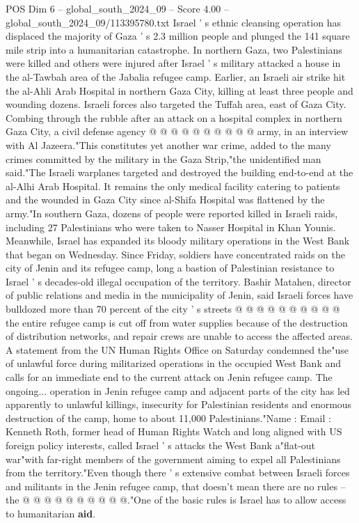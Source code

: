 \begin{textsample}{POS Dim 6 – global\_south\_2024\_09 – Score 4.00 – global\_south\_2024\_09/113395780.txt}
Israel ' s ethnic cleansing operation has displaced the majority of Gaza ' s 2.3 million people and plunged the 141 square mile strip into a humanitarian catastrophe.
In northern Gaza, two Palestinians were killed and others were injured after Israel ' s military attacked a house in the al-Tawbah area of the Jabalia refugee camp.
Earlier, an Israeli air strike hit the al-Ahli Arab Hospital in northern Gaza City, killing at least three people and wounding dozens.
Israeli forces also targeted the Tuffah area, east of Gaza City.
Combing through the rubble after an attack on a hospital complex in northern Gaza City, a civil defense agency @ @ @ @ @ @ @ @ @ @ army, in an interview with Al Jazeera."This constitutes yet another war crime, added to the many crimes committed by the military in the Gaza Strip,"the unidentified man said."The Israeli warplanes targeted and destroyed the building end-to-end at the al-Alhi Arab Hospital.
It remains the only medical facility catering to patients and the wounded in Gaza City since al-Shifa Hospital was flattened by the army."In southern Gaza, dozens of people were reported killed in Israeli raids, including 27 Palestinians who were taken to Nasser Hospital in Khan Younis.
Meanwhile, Israel has expanded its bloody military operations in the West Bank that began on Wednesday.
Since Friday, soldiers have concentrated raids on the city of Jenin and its refugee camp, long a bastion of Palestinian resistance to Israel ' s decades-old illegal occupation of the territory.
Bashir Matahen, director of public relations and media in the municipality of Jenin, said Israeli forces have bulldozed more than 70 percent of the city ' s streets @ @ @ @ @ @ @ @ @ @ the entire refugee camp is cut off from water supplies because of the destruction of distribution networks, and repair crews are unable to access the affected areas.
A statement from the UN Human Rights Office on Saturday condemned the"use of unlawful force during militarized operations in the occupied West Bank and calls for an immediate end to the current attack on Jenin refugee camp.
The ongoing... operation in Jenin refugee camp and adjacent parts of the city has led apparently to unlawful killings, insecurity for Palestinian residents and enormous destruction of the camp, home to about 11,000 Palestinians."Name : Email : Kenneth Roth, former head of Human Rights Watch and long aligned with US foreign policy interests, called Israel ' s attacks the West Bank a"flat-out war"with far-right members of the government aiming to expel all Palestinians from the territory."Even though there ' s extensive combat between Israeli forces and militants in the Jenin refugee camp, that doesn't mean there are no rules -- the @ @ @ @ @ @ @ @ @ @."One of the basic rules is Israel has to allow access to humanitarian \textbf{aid}.

\end{textsample}
